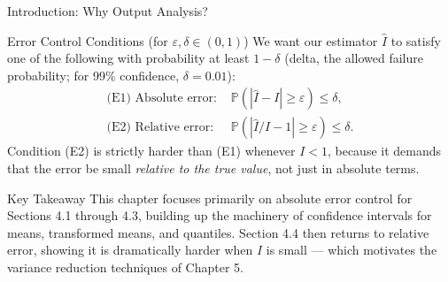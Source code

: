 \documentclass[aspectratio=169,10pt]{beamer}
\begin{document}
\begin{frame}[allowframebreaks]{Introduction: Why Output Analysis?}
\begin{block}{Error Control Conditions (for $\varepsilon, \delta \in (0,1)$)}
  We want our estimator $\hat{I}$ to satisfy one of the following with
  probability at least $1 - \delta$ (delta, the allowed failure
  probability; for 99\% confidence, $\delta = 0.01$):
  \begin{align*}
    \text{(E1) Absolute error: } &
      \mathbb{P}\!\left(|\hat{I} - I| \geq \varepsilon\right) \leq \delta, \\[4pt]
    \text{(E2) Relative error: } &
      \mathbb{P}\!\left(|\hat{I}/I - 1| \geq \varepsilon\right) \leq \delta.
  \end{align*}
  Condition (E2) is strictly harder than (E1) whenever $I < 1$, because
  it demands that the error be small \emph{relative to the true value},
  not just in absolute terms.
\end{block}

\begin{alertblock}{Key Takeaway}
  This chapter focuses primarily on absolute error control for Sections
  4.1 through 4.3, building up the machinery of confidence intervals for
  means, transformed means, and quantiles.  Section 4.4 then returns to
  relative error, showing it is dramatically harder when $I$ is small ---
  which motivates the variance reduction techniques of Chapter 5.
\end{alertblock}

\end{frame}

\end{document}
